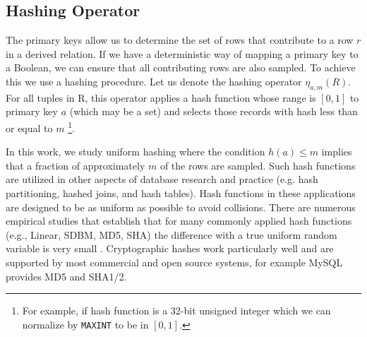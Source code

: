 \subsection{Hashing Operator}
\label{push}
The primary keys allow us to determine the set of rows that contribute to a row $r$ in a derived relation.
If we have a deterministic way of mapping a primary key to a Boolean, we can ensure that all contributing rows are also sampled. 
To achieve this we use a hashing procedure.
Let us denote the hashing operator $\eta_{a, m}(R)$. 
For all tuples in R, this operator applies a hash function whose range is $[0,1]$ to primary key $a$ (which may be a set) and selects those records with hash less than or equal to $m$ \footnote{\scriptsize For example, if hash function is a 32-bit unsigned integer which we can normalize by \texttt{MAXINT} to be in $[0,1]$.}.

In this work, we study uniform hashing where the condition $h(a) \le m$ implies that a fraction of approximately $m$ of the rows are sampled.
Such hash functions are utilized in other aspects of database research and practice (e.g. hash partitioning, hashed joins, and hash tables).
Hash functions in these applications are designed to be as uniform as possible to avoid collisions.
There are numerous empirical studies that establish that for many commonly applied hash functions (e.g., Linear, SDBM, MD5, SHA) the difference with a true uniform random variable is very small \cite{henke2009empirical, l2007testu01}.
Cryptographic hashes work particularly well and are supported by most commercial and open source systems, for example MySQL provides MD5 and SHA1/2.


